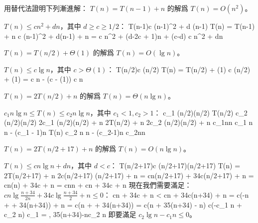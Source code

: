\startsection[
  title={The substitution method for solving recurrences},
]

\startEXERCISE
用替代法證明下列漸進解：
\startigBase[a]
\startitem
$T(n)=T(n-1)+n$ 的解爲 $T(n)=O(n^2)$。

\startANSWER
$T(n) \le c n^2 + d n$，其中 $d\ge c \ge 1/2$：
\startformula\startmathalignment
\NC T(n-1)\NC \le c (n-1)^2 + d (n-1) \NR
\NC T(n) \NC = T(n-1) + n \NR
\NC \NC \le c (n-1)^2 + d(n-1) + n \NR
\NC \NC = c n^2 + (d-2c + 1)n + (c-d) \NR
\NC \NC \le c n^2 + dn \NR
\stopmathalignment\stopformula
\stopANSWER
\stopitem

\startitem
$T(n)=T(n/2)+\Theta(1)$ 的解爲 $T(n)=O(\lg n)$。

\startANSWER
$T(n)\le c \lg n$，其中 $c>\Theta(1)$：
\startformula\startmathalignment
\NC T(n/2)\NC \le c \lg(n/2) \NR
\NC T(n) \NC = T(n/2) + \Theta(1) \NR
\NC \NC \le c \lg(n/2) + \Theta(1) \NR
\NC \NC = c \lg n - (c - \Theta(1)) \NR
\NC \NC \le c \lg n \NR
\stopmathalignment\stopformula
\stopANSWER
\stopitem

\startitem
$T(n)=2T(n/2)+n$ 的解爲 $T(n)=\Theta(n\lg n)$。

\startANSWER
$c_1 n \lg n \le T(n) \le c_2 n\lg n$，其中 $c_1<1, c_2>1$：
\startformula\startmathalignment[n=3,align={right,middle,left}]
\NC c_1 (n/2)\lg(n/2) \le \NC T(n/2) \NC \le c_2 (n/2)\lg(n/2) \NR
\NC 2c_1 (n/2)\lg(n/2) + n \le \NC 2T(n/2) + n \NC \le 2c_2 (n/2)\lg(n/2) + n \NR
\NC c_1n\lg n \le c_1 n \lg n - (c_1 - 1)n \le
 \NC T(n)
 \NC \le c_2 n \lg n - (c_2-1)n \le c_2n\lg n\NR
\stopmathalignment\stopformula
\stopANSWER
\stopitem

\startitem
$T(n)=2T(n/2+17)+n$ 的解爲 $T(n)=O(n\lg n)$。

\startANSWER
$T(n)\le cn \lg n + dn$，其中 $d < c$：
\startformula\startmathalignment
\NC T(n/2+17)\NC \le c (n/2+17)\lg(n/2+17) \NR
\NC T(n) \NC = 2T(n/2+17) + n \NR
\NC \NC \le 2c(n/2+17) \lg(n/2+17) + n \NR
\NC \NC = cn\lg(n/2+17) + 34c\lg(n/2+17) + n \NR
\NC \NC = cn\lg(n) + 34c\lg{} + n \NR
\NC \NC = cn\lg n + cn\lg{} + 34c\lg{} + n \NR
\stopmathalignment\stopformula
現在我們需要滿足： $cn\lg\frac{n+34}{2n} + 34c\lg\frac{n+34}{2} + n\le 0$：
\startformula\startmathalignment
\NC \NC cn\lg{} + 34c\lg{} + n \NR
\NC < \NC cn\lg{} + 34c\lg(n+34) + n \NR
\NC = \NC c(-n + \lg{} + 34\lg(n+34)) + n\NR
\NC = \NC c(n + \lg{} + 34\lg(n+34))\NR
\NC = \NC c(n + 35\lg(n+34) - \lg n)\NR
\NC \le \NC c(-c_1 n + c_2 \lg n) \qquad
  c_1 = , 35\lg(n+34)-\lg n\le c_2 \lg n\NR
\stopmathalignment\stopformula
即要滿足 $c_2\lg n -c_1 n \le 0$。


